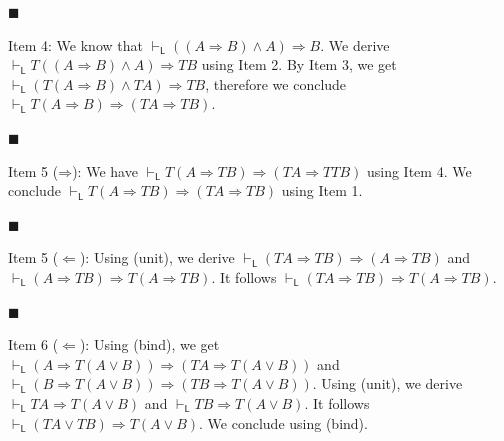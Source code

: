  
 
\par\noindent  $\blacksquare$ 
 
Item 4: We know that $\vdash_{\mathsf{L}}((A\mathbin{\Rightarrow}B)\mathbin{\wedge}A)\mathbin{\Rightarrow}B$. We derive $\vdash_{\mathsf{L}}T((A\mathbin{\Rightarrow}B)\mathbin{\wedge}A)\mathbin{\Rightarrow}TB$ using Item 2. By Item 3, we get $\vdash_{\mathsf{L}}(T(A\mathbin{\Rightarrow}B)\mathbin{\wedge}TA)\mathbin{\Rightarrow}TB$, therefore we conclude $\vdash_{\mathsf{L}}T(A\mathbin{\Rightarrow}B)\mathbin{\Rightarrow}(TA\mathbin{\Rightarrow}TB)$.\par
 
 
 
\par\noindent  $\blacksquare$ 
 
Item 5 ($\mathbin{\Rightarrow}$): We have $\vdash_{\mathsf{L}}T(A\mathbin{\Rightarrow}TB)\mathbin{\Rightarrow}(TA\mathbin{\Rightarrow}TTB)$ using Item 4. We conclude $\vdash_{\mathsf{L}}T(A\mathbin{\Rightarrow}TB)\mathbin{\Rightarrow}(TA\mathbin{\Rightarrow}TB)$ using Item 1.\par
 
 
 
\par\noindent  $\blacksquare$ 
 
Item 5 ($\Leftarrow$): Using (unit), we derive $\vdash_{\mathsf{L}}(TA\mathbin{\Rightarrow}TB)\mathbin{\Rightarrow}(A\mathbin{\Rightarrow}TB)$ and $\vdash_{\mathsf{L}}(A\mathbin{\Rightarrow}TB)\mathbin{\Rightarrow}T(A\mathbin{\Rightarrow}TB)$. It follows $\vdash_{\mathsf{L}}(TA\mathbin{\Rightarrow}TB)\mathbin{\Rightarrow}T(A\mathbin{\Rightarrow}TB)$.\par
 
 
 
\par\noindent  $\blacksquare$ 
 
Item 6 ($\Leftarrow$): Using (bind), we get $\vdash_{\mathsf{L}}(A\mathbin{\Rightarrow}T(A\mathbin{\vee}B))\mathbin{\Rightarrow}(TA\mathbin{\Rightarrow}T(A\mathbin{\vee}B))$ and $\vdash_{\mathsf{L}}(B\mathbin{\Rightarrow}T(A\mathbin{\vee}B))\mathbin{\Rightarrow}(TB\mathbin{\Rightarrow}T(A\mathbin{\vee}B))$. Using (unit), we derive $\vdash_{\mathsf{L}}TA\mathbin{\Rightarrow}T(A\mathbin{\vee}B)$ and $\vdash_{\mathsf{L}}TB\mathbin{\Rightarrow}T(A\mathbin{\vee}B)$. It follows $\vdash_{\mathsf{L}}(TA\mathbin{\vee}TB)\mathbin{\Rightarrow}T(A\mathbin{\vee}B)$. We conclude using (bind).\par
 
